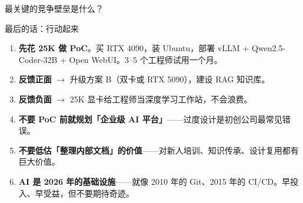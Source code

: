 \documentclass[UTF8,11pt,aspectratio=169]{beamer}
\begin{document}
\begin{frame}{最关键的竞争壁垒是什么？}
\end{frame}

\begin{frame}{最后的话：行动起来}
  \begin{enumerate}
    \item \textbf{先花 \textyen{}25K 做 PoC}。买 RTX 4090，装 Ubuntu，部署 vLLM + Qwen2.5-Coder-32B + Open WebUI。3--5 个工程师试用一个月。

    \item \textbf{反馈正面} $\rightarrow$ 升级方案 B（双卡或 RTX 5090），建设 RAG 知识库。

    \item \textbf{反馈负面} $\rightarrow$ \textyen{}25K 显卡给工程师当深度学习工作站，不会浪费。

    \item \textbf{不要 PoC 前就规划「企业级 AI 平台」}------过度设计是初创公司最常见错误。

    \item \textbf{不要低估「整理内部文档」的价值}------对新人培训、知识传承、设计复用都有巨大价值。

    \item \textbf{AI 是 2026 年的基础设施}------就像 2010 年的 Git、2015 年的 CI/CD。早投入、早受益，但不要期待奇迹。
  \end{enumerate}
\end{frame}
\end{document}
